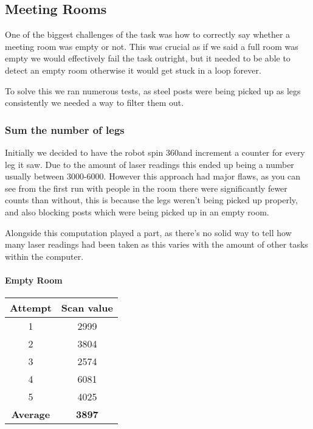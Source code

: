 \documentclass[12pt]{article}
\begin{document}
\subsection{Meeting Rooms}

One of the biggest challenges of the task was how to correctly say whether a meeting room was empty or not. This was crucial as if we said a full room was empty we would effectively fail the task outright, but it needed to be able to detect an empty room otherwise it would get stuck in a loop forever. 

To solve this we ran numerous tests, as steel posts were being picked up as legs consistently we needed a way to filter them out.

\subsubsection{Sum the number of legs}

Initially we decided to have the robot spin 360\degree and increment a counter for every leg it saw. Due to the amount of laser readings this ended up being a number usually between 3000-6000. However this approach had major flaws, as you can see from the first run with people in the room there were significantly fewer counts than without, this is because the legs weren't being picked up properly, and also blocking posts which were being picked up in an empty room.

Alongside this computation played a part, as there's no solid way to tell how many laser readings had been taken as this varies with the amount of other tasks within the computer.

\paragraph{Empty Room}
\begin{center}
\begin{tabular}{|c|c|}
\hline
Attempt & Scan value\\
\hline
1 & 2999\\
2 & 3804\\
3 & 2574\\
4 & 6081\\
5 & 4025\\
\hline
\textbf{Average} & \textbf{3897}\\
\hline
\end{tabular}
\end{center}
\end{document}
